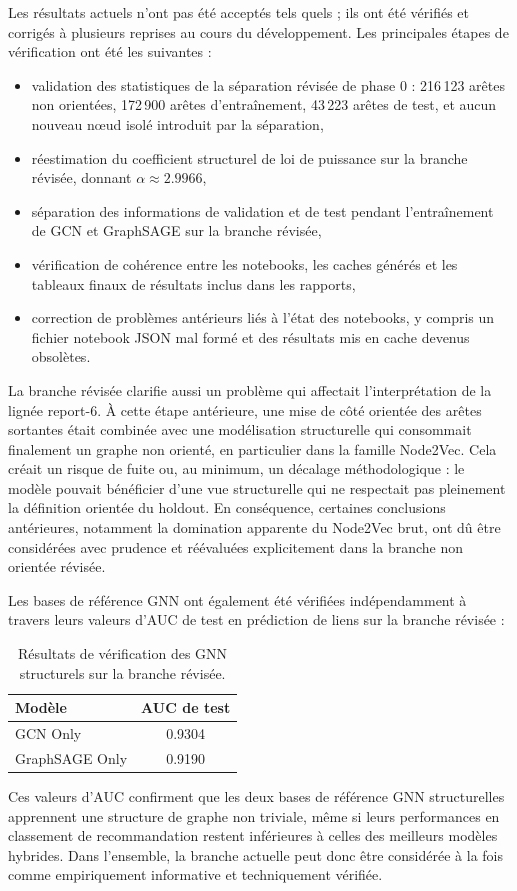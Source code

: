Les résultats actuels n'ont pas été acceptés tels quels ; ils ont été
vérifiés et corrigés à plusieurs reprises au cours du développement. Les
principales étapes de vérification ont été les suivantes :
\begin{itemize}
    \item validation des statistiques de la séparation révisée de phase 0 :
    216\,123 arêtes non orientées, 172\,900 arêtes d'entraînement, 43\,223
    arêtes de test, et aucun nouveau nœud isolé introduit par la séparation,
    \item réestimation du coefficient structurel de loi de puissance sur la
    branche révisée, donnant $\alpha \approx 2.9966$,
    \item séparation des informations de validation et de test pendant
    l'entraînement de GCN et GraphSAGE sur la branche révisée,
    \item vérification de cohérence entre les notebooks, les caches générés et
    les tableaux finaux de résultats inclus dans les rapports,
    \item correction de problèmes antérieurs liés à l'état des notebooks, y
    compris un fichier notebook JSON mal formé et des résultats mis en cache
    devenus obsolètes.
\end{itemize}

La branche révisée clarifie aussi un problème qui affectait l'interprétation
de la lignée report-6. À cette étape antérieure, une mise de côté orientée des
arêtes sortantes était combinée avec une modélisation structurelle qui
consommait finalement un graphe non orienté, en particulier dans la famille
Node2Vec. Cela créait un risque de fuite ou, au minimum, un décalage
méthodologique : le modèle pouvait bénéficier d'une vue structurelle qui ne
respectait pas pleinement la définition orientée du holdout. En conséquence,
certaines conclusions antérieures, notamment la domination apparente du
Node2Vec brut, ont dû être considérées avec prudence et réévaluées
explicitement dans la branche non orientée révisée.

Les bases de référence GNN ont également été vérifiées indépendamment à
travers leurs valeurs d'AUC de test en prédiction de liens sur la branche
révisée :
\begin{table}[H]
\centering
\caption{Résultats de vérification des GNN structurels sur la branche révisée.}
\label{tab:gnn-auc}
\begin{tabular}{lc}
\toprule
\textbf{Modèle} & \textbf{AUC de test} \\
\midrule
GCN Only & 0.9304 \\
GraphSAGE Only & 0.9190 \\
\bottomrule
\end{tabular}
\end{table}

Ces valeurs d'AUC confirment que les deux bases de référence GNN structurelles
apprennent une structure de graphe non triviale, même si leurs performances en
classement de recommandation restent inférieures à celles des meilleurs modèles
hybrides. Dans l'ensemble, la branche actuelle peut donc être considérée à la
fois comme empiriquement informative et techniquement vérifiée.
